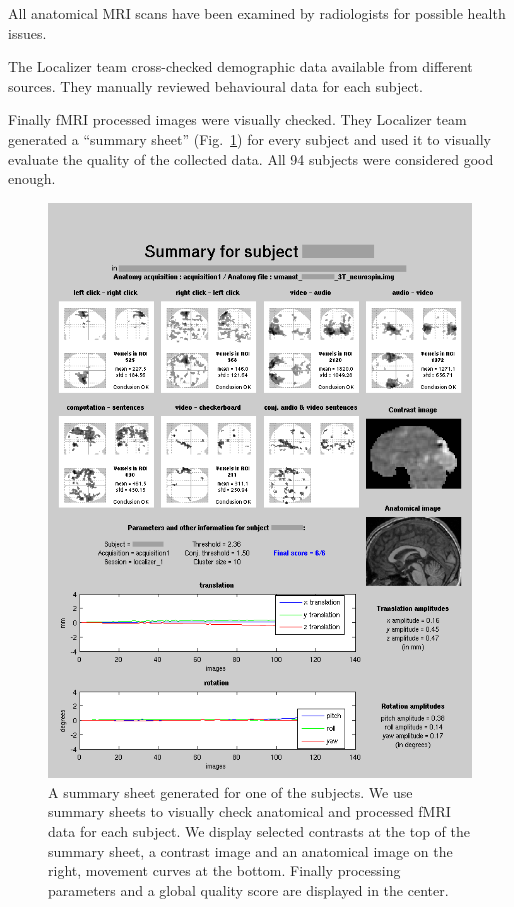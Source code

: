 \documentclass[review]{elsarticle}
\begin{document}
All anatomical MRI scans have been examined by radiologists for possible health issues.

The Localizer team cross-checked demographic data available from different
sources. They manually reviewed behavioural data for each subject.

Finally fMRI processed images were visually checked. They Localizer team
generated a ``summary sheet'' (Fig.~\ref{fig:summary}) for every subject and
used it to visually evaluate the quality of the collected data. All 94 subjects
were considered good enough.

\begin{figure}[ht!]
    \centering
    \includegraphics[scale=0.45]{summary}
    \caption{A summary sheet generated for one of the subjects. We use summary sheets to visually check anatomical and processed fMRI data for each subject. We display selected contrasts at the top of the summary sheet, a contrast image and an anatomical image on the right, movement curves at the bottom. Finally processing parameters and a global quality score are displayed in the center.}
    \label{fig:summary}
\end{figure}
\end{document}
